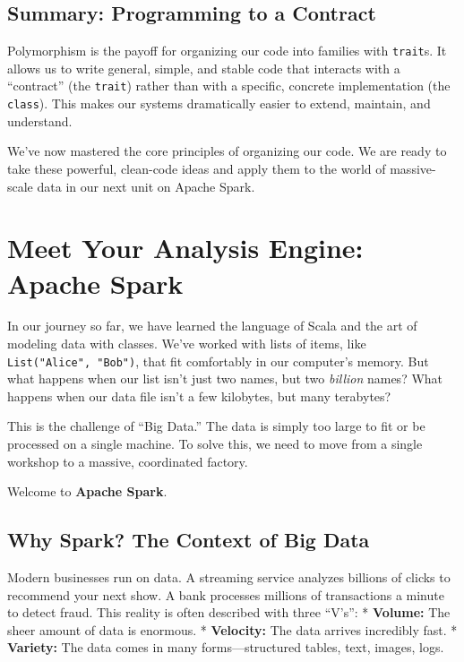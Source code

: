 \documentclass[
  letterpaper,
  DIV=11,
  numbers=noendperiod]{scrreprt}
\begin{document}
\section{Summary: Programming to a
Contract}\label{summary-programming-to-a-contract}

Polymorphism is the payoff for organizing our code into families with
\texttt{trait}s. It allows us to write general, simple, and stable code
that interacts with a ``contract'' (the \texttt{trait}) rather than with
a specific, concrete implementation (the \texttt{class}). This makes our
systems dramatically easier to extend, maintain, and understand.

We've now mastered the core principles of organizing our code. We are
ready to take these powerful, clean-code ideas and apply them to the
world of massive-scale data in our next unit on Apache Spark.


\chapter{Meet Your Analysis Engine: Apache
Spark}\label{meet-your-analysis-engine-apache-spark}

In our journey so far, we have learned the language of Scala and the art
of modeling data with classes. We've worked with lists of items, like
\texttt{List("Alice",\ "Bob")}, that fit comfortably in our computer's
memory. But what happens when our list isn't just two names, but two
\emph{billion} names? What happens when our data file isn't a few
kilobytes, but many terabytes?

This is the challenge of ``Big Data.'' The data is simply too large to
fit or be processed on a single machine. To solve this, we need to move
from a single workshop to a massive, coordinated factory.

Welcome to \textbf{Apache Spark}.

\section{Why Spark? The Context of Big
Data}\label{why-spark-the-context-of-big-data}

Modern businesses run on data. A streaming service analyzes billions of
clicks to recommend your next show. A bank processes millions of
transactions a minute to detect fraud. This reality is often described
with three ``V's'': * \textbf{Volume:} The sheer amount of data is
enormous. * \textbf{Velocity:} The data arrives incredibly fast. *
\textbf{Variety:} The data comes in many forms---structured tables,
text, images, logs.
\end{document}
